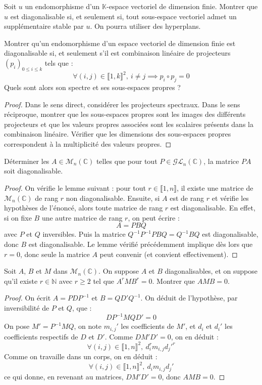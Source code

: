 \documentclass[french,a4paper]{article}
\newcommand{\N}{\mathbb{N}}
\newcommand{\C}{\mathbb{C}}
\newcommand{\K}{\mathbb{K}}
\newcommand{\inv}{^{-1}}
\theoremstyle{plain}
\theoremstyle{definition}
\theoremstyle{remark}
\begin{document}
\begin{ex}{}
	Soit $u$ un endomorphisme d'un $\K$-espace vectoriel de dimension finie. Montrer que $u$ est diagonalisable si, et seulement si, tout sous-espace vectoriel admet un supplémentaire stable par $u$. On pourra utiliser des hyperplans.
\end{ex}

\begin{ex}{}
	Montrer qu'un endomorphisme d'un espace vectoriel de dimension finie est diagonalisable si, et seulement s'il est combinaison linéaire de projecteurs $(p_i)_{0\leqslant i\leqslant k}$ tels que : $$\forall (i,j)\in\llbracket1,k\rrbracket^2,\ i\ne j\implies p_i\circ p_j=0$$ Quels sont alors son spectre et ses sous-espaces propres ?
\end{ex}
\begin{proof}
	Dans le sens direct, considérer les projecteurs spectraux. Dans le sens réciproque, montrer que les sous-espaces propres sont les images des différents projecteurs et que les valeurs propres associées sont les scalaires présents dans la combinaison linéaire. Vérifier que les dimensions des sous-espaces propres correspondent à la multiplicité des valeurs propres.
\end{proof}

\begin{ex}{}
	Déterminer les $A\in\mathcal{M}_n(\C)$ telles que pour tout $P\in\mathcal{GL}_n(\C)$, la matrice $PA$ soit diagonalisable.
\end{ex}
\begin{proof}
	On vérifie le lemme suivant : pour tout $r\in\llbracket1,n\rrbracket$, il existe une matrice de $\mathcal{M}_n(\C)$ de rang $r$ non diagonalisable. Ensuite, si $A$ est de rang $r$ et vérifie les hypothèses de l'énoncé, alors toute matrice de rang $r$ est diagonalisable. En effet, si on fixe $B$ une autre matrice de rang $r$, on peut écrire : $$A=PBQ$$ avec $P$ et $Q$ inversibles. Puis la matrice $Q\inv P\inv PBQ=Q\inv BQ$ est diagonalisable, donc $B$ est diagonalisable. Le lemme vérifié précédemment implique dès lors que $r=0$, donc seule la matrice $A$ peut convenir (et convient effectivement).
\end{proof}

\begin{ex}{}
	Soit $A$, $B$ et $M$ dans $\mathcal{M}_n(\C)$. On suppose $A$ et $B$ diagonalisables, et on suppose qu'il existe $r\in\N$ avec $r\geqslant 2$ tel que $A^rMB^r=0$. Montrer que $AMB=0$.
\end{ex}
\begin{proof}
	On écrit $A=PDP\inv$ et $B=QD'Q\inv$. On déduit de l'hypothèse, par inversibilité de $P$ et $Q$, que : $$DP\inv MQD'=0$$ On pose $M'=P\inv MQ$, on note $m_{i,j}'$ les coefficients de $M'$, et $d_i$ et $d_i'$ les coefficients respectifs de $D$ et $D'$. Comme $DM'D'=0$, on en déduit : $$\forall (i,j)\in\llbracket1,n\rrbracket^2,\ d_i^rm_{i,j}d_j'^r$$ Comme on travaille dans un corps, on en déduit : $$\forall (i,j)\in\llbracket1,n\rrbracket^2,\ d_im_{i,j}d_j'$$ ce qui donne, en revenant au matrices, $DM'D'=0$, donc $AMB=0$.
\end{proof}
\end{document}

